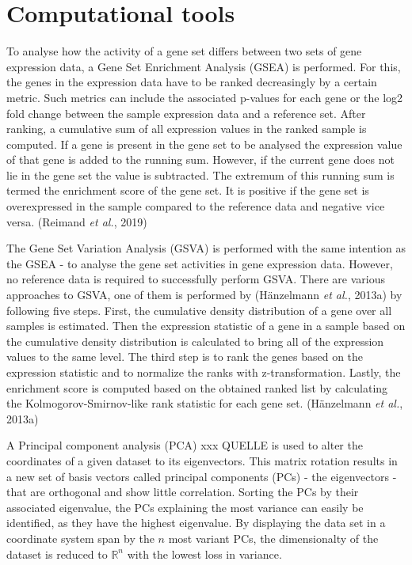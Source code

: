 \documentclass[
  parskip,
  oneside]{scrreprt}
\begin{document}
\hypertarget{computational-tools}{%
\section{Computational tools}\label{computational-tools}}

To analyse how the activity of a gene set differs between two sets of
gene expression data, a Gene Set Enrichment Analysis (GSEA) is
performed. For this, the genes in the expression data have to be ranked
decreasingly by a certain metric. Such metrics can include the
associated p-values for each gene or the log2 fold change between the
sample expression data and a reference set. After ranking, a cumulative
sum of all expression values in the ranked sample is computed. If a gene
is present in the gene set to be analysed the expression value of that
gene is added to the running sum. However, if the current gene does not
lie in the gene set the value is subtracted. The extremum of this
running sum is termed the enrichment score of the gene set. It is
positive if the gene set is overexpressed in the sample compared to the
reference data and negative vice versa. (Reimand \emph{et al.}, 2019)

The Gene Set Variation Analysis (GSVA) is performed with the same
intention as the GSEA - to analyse the gene set activities in gene
expression data. However, no reference data is required to successfully
perform GSVA. There are various approaches to GSVA, one of them is
performed by (Hänzelmann \emph{et al.}, 2013a) by following five steps.
First, the cumulative density distribution of a gene over all samples is
estimated. Then the expression statistic of a gene in a sample based on
the cumulative density distribution is calculated to bring all of the
expression values to the same level. The third step is to rank the genes
based on the expression statistic and to normalize the ranks with
z-transformation. Lastly, the enrichment score is computed based on the
obtained ranked list by calculating the Kolmogorov-Smirnov-like rank
statistic for each gene set. (Hänzelmann \emph{et al.}, 2013a)

A Principal component analysis (PCA) xxx QUELLE is used to alter the
coordinates of a given dataset to its eigenvectors. This matrix rotation
results in a new set of basis vectors called principal components (PCs)
- the eigenvectors - that are orthogonal and show little correlation.
Sorting the PCs by their associated eigenvalue, the PCs explaining the
most variance can easily be identified, as they have the highest
eigenvalue. By displaying the data set in a coordinate system span by
the \(n\) most variant PCs, the dimensionalty of the dataset is reduced
to \(\mathbb{R}^n\) with the lowest loss in variance.
\end{document}
